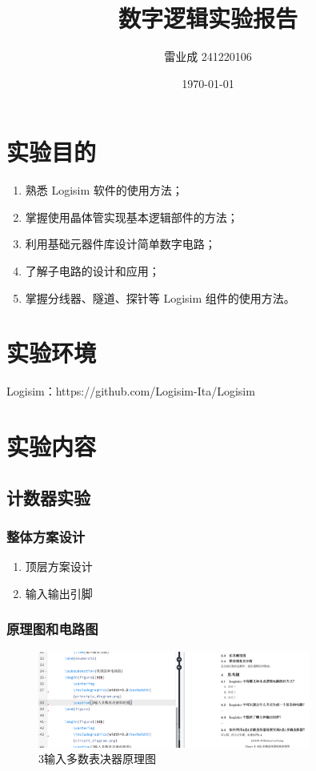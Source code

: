 \documentclass{article}
\title{数字逻辑实验报告}
\author{雷业成 241220106}
\date{\today}
\begin{document}
\maketitle

\section{实验目的}
\begin{enumerate}
  \item 熟悉 Logisim 软件的使用方法；
  \item 掌握使用晶体管实现基本逻辑部件的方法；
  \item 利用基础元器件库设计简单数字电路；
  \item 了解子电路的设计和应用；
  \item 掌握分线器、隧道、探针等 Logisim 组件的使用方法。
\end{enumerate}

\section{实验环境}
Logisim：https://github.com/Logisim-Ita/Logisim

\section{实验内容}
\subsection{计数器实验}
\subsubsection{整体方案设计}
\begin{enumerate}
    \item 顶层方案设计

    
    \item 输入输出引脚
    
\end{enumerate}

\subsubsection{原理图和电路图}
\begin{figure}[htb]
  \centering
  \includegraphics[width=0.8\textwidth]{image.png} %
  \caption{3输入多数表决器原理图}
\end{figure}
\end{document}
